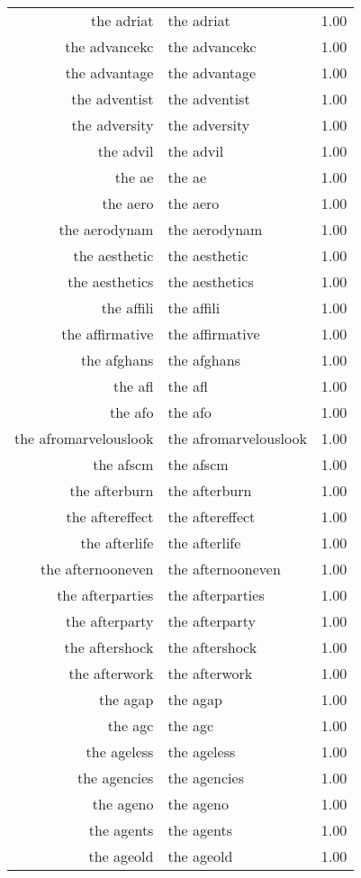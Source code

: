 \begin{table}[ht]
\begin{tabular}{rlr}
  the adriat & the adriat & 1.00 \\ 
  the advancekc & the advancekc & 1.00 \\ 
  the advantage & the advantage & 1.00 \\ 
  the adventist & the adventist & 1.00 \\ 
  the adversity & the adversity & 1.00 \\ 
  the advil & the advil & 1.00 \\ 
  the ae & the ae & 1.00 \\ 
  the aero & the aero & 1.00 \\ 
  the aerodynam & the aerodynam & 1.00 \\ 
  the aesthetic & the aesthetic & 1.00 \\ 
  the aesthetics & the aesthetics & 1.00 \\ 
  the affili & the affili & 1.00 \\ 
  the affirmative & the affirmative & 1.00 \\ 
  the afghans & the afghans & 1.00 \\ 
  the afl & the afl & 1.00 \\ 
  the afo & the afo & 1.00 \\ 
  the afromarvelouslook & the afromarvelouslook & 1.00 \\ 
  the afscm & the afscm & 1.00 \\ 
  the afterburn & the afterburn & 1.00 \\ 
  the aftereffect & the aftereffect & 1.00 \\ 
  the afterlife & the afterlife & 1.00 \\ 
  the afternooneven & the afternooneven & 1.00 \\ 
  the afterparties & the afterparties & 1.00 \\ 
  the afterparty & the afterparty & 1.00 \\ 
  the aftershock & the aftershock & 1.00 \\ 
  the afterwork & the afterwork & 1.00 \\ 
  the agap & the agap & 1.00 \\ 
  the agc & the agc & 1.00 \\ 
  the ageless & the ageless & 1.00 \\ 
  the agencies & the agencies & 1.00 \\ 
  the ageno & the ageno & 1.00 \\ 
  the agents & the agents & 1.00 \\ 
  the ageold & the ageold & 1.00 \\ 

\end{tabular}
\end{table}
